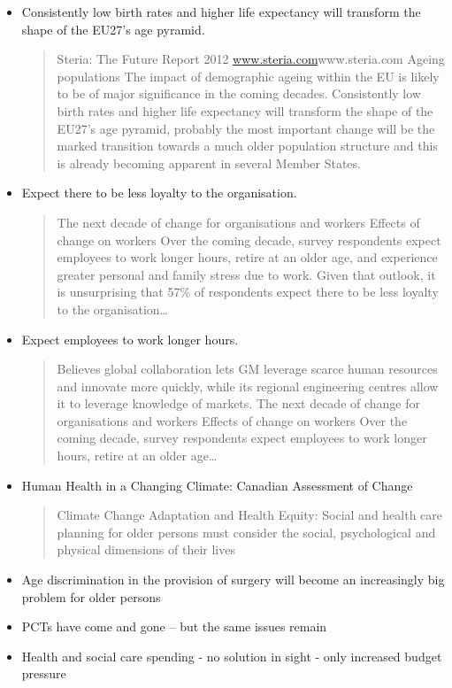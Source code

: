 \begin{itemize}
\item Consistently low birth rates and higher life expectancy will transform the shape of the EU27's age pyramid.
\begin{quotation}Steria: The Future Report 2012 \url{www.steria.com}{www.steria.com} Ageing populations The impact of demographic ageing within the EU is likely to be of major significance in the coming decades. Consistently low birth rates and higher life expectancy will transform the shape of the EU27's age pyramid, probably the most important change will be the marked transition towards a much older population structure and this is already becoming apparent in several Member States.\end{quotation}
\item Expect there to be less loyalty to the organisation.
\begin{quotation}
The next decade of change for organisations and workers Effects of change on workers Over the coming decade, survey respondents expect employees to work longer hours, retire at an older age, and experience greater personal and family stress due to work. Given that outlook, it is unsurprising that 57\% of respondents expect there to be less loyalty to the organisation\dots\end{quotation}
\item Expect employees to work longer hours.
\begin{quotation}
Believes global collaboration lets GM leverage scarce human resources and innovate more quickly, while its regional engineering centres allow it to leverage knowledge of markets. The next decade of change for organisations and workers Effects of change on workers Over the coming decade, survey respondents expect employees to work longer hours, retire at an older age\ldots\end{quotation}
\item Human Health  in a Changing Climate: Canadian Assessment of Change
\begin{quotation}
Climate Change Adaptation and Health Equity: Social and health care planning for older persons must consider the social, psychological and physical dimensions of their lives\end{quotation}
\item Age discrimination in the provision of surgery will become an increasingly big problem for older persons
\item PCTs have come and gone -- but the same issues remain
\item Health and social care spending - no solution in sight - only increased budget pressure

\end{itemize}
